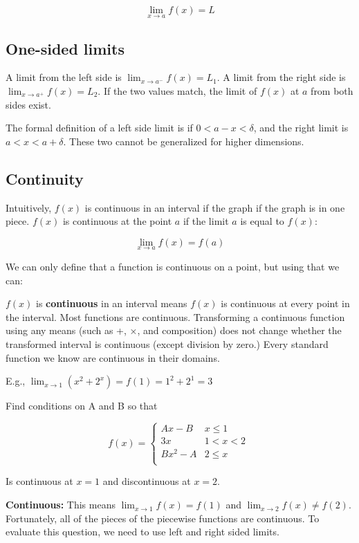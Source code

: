 \documentclass[12pt]{article}
\theoremstyle{plain}
\theoremstyle{remark}
\theoremstyle{definition}
\begin{document}
\[\lim_{x \rightarrow a}{f(x) = L}\]


\subsection{One-sided limits}

A limit from the left side is
\(\lim_{x \rightarrow a^{-}}{f(x) = L_{1}}\). A limit from the right
side is \(\lim_{x \rightarrow a^{+}}{f(x) = L_{2}}\). If the two values
match, the limit of \(f(x)\) at \(a\) from both sides exist.

The formal definition of a left side limit is if \(0 < a - x < \delta\),
and the right limit is \(a < x < a + \delta\). These two cannot be
generalized for higher dimensions.


\subsection{Continuity}

Intuitively, \(f(x)\) is continuous in an interval if the graph if the
graph is in one piece. \(f(x)\) is continuous at the point \(a\) if the
limit \(a\) is equal to \(f(x)\):

\[\lim_{x \rightarrow a}{f(x) = f(a)}\]

We can only define that a function is continuous on a point, but using
that we can:

\(f(x)\) is \textbf{continuous} in an interval means \(f(x)\) is
continuous at every point in the interval. Most functions are
continuous. Transforming a continuous function using any means (such as
+, ×, and composition) does not change whether the transformed interval
is continuous (except division by zero.) Every standard function we know
are continuous in their domains.

E.g.,
\(\lim_{x \rightarrow 1}{\left( x^{2} + 2^{x} \right) = f(1) = 1^{2} + 2^{1} = 3}\)

Find conditions on A and B so that

\[f(x) = \left\{ \begin{matrix}
Ax - B & x \leq 1 \\
3x & 1 < x < 2 \\
Bx^{2} - A & 2 \leq x \\
\end{matrix} \right.\ \]

Is continuous at \(x = 1\) and discontinuous at \(x = 2\).

\textbf{Continuous:} This means \(\lim_{x \rightarrow 1}{f(x) = f(1)}\)
and \(\lim_{x \rightarrow 2}{f(x) \neq f(2)}\). Fortunately, all of the
pieces of the piecewise functions are continuous. To evaluate this
question, we need to use left and right sided limits.
\end{document}
